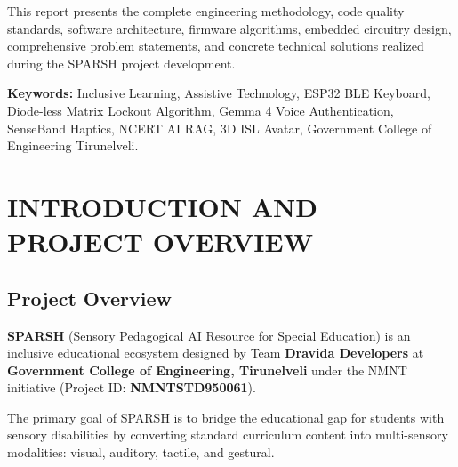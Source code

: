 \documentclass[12pt,a4paper]{report}
\begin{document}
This report presents the complete engineering methodology, code quality standards, software architecture, firmware algorithms, embedded circuitry design, comprehensive problem statements, and concrete technical solutions realized during the SPARSH project development.

\vspace{0.5cm}
\noindent \textbf{Keywords:} Inclusive Learning, Assistive Technology, ESP32 BLE Keyboard, Diode-less Matrix Lockout Algorithm, Gemma 4 Voice Authentication, SenseBand Haptics, NCERT AI RAG, 3D ISL Avatar, Government College of Engineering Tirunelveli.

\clearpage
\tableofcontents
\clearpage
\listoftables

\clearpage
\chapter{INTRODUCTION AND PROJECT OVERVIEW}

\section{Project Overview}
\textbf{SPARSH} (Sensory Pedagogical AI Resource for Special Education) is an inclusive educational ecosystem designed by Team \textbf{Dravida Developers} at \textbf{Government College of Engineering, Tirunelveli} under the NMNT initiative (Project ID: \textbf{NMNTSTD950061}).

The primary goal of SPARSH is to bridge the educational gap for students with sensory disabilities by converting standard curriculum content into multi-sensory modalities: visual, auditory, tactile, and gestural.
\end{document}
